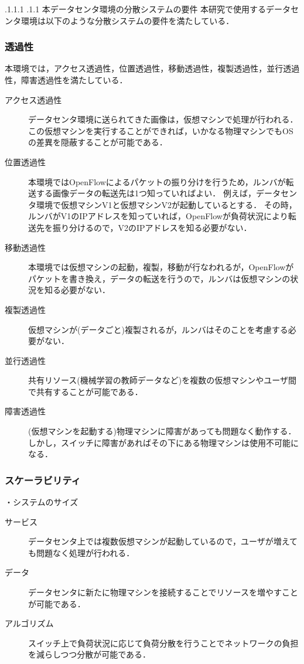 \documentclass[a4paper, twocolumn]{jarticle}
\makeatletter
\def\subsection{\@startsection{subsection}{1}{\z@}%
 {.1\Cvs \@plus.1\Cdp \@minus.1\Cdp}%
 {.1\Cvs \@plus.1\Cdp}%
 {\normalfont\normalsize\bfseries}}
\makeatother
\begin{document}
\subsection{本データセンタ環境の分散システムの要件}
本研究で使用するデータセンタ環境は以下のような分散システムの要件を満たしている．

\subsubsection{透過性}
本環境では，アクセス透過性，位置透過性，移動透過性，複製透過性，並行透過性，障害透過性を満たしている．
\begin{description}
\item [アクセス透過性]
データセンタ環境に送られてきた画像は，仮想マシンで処理が行われる．
この仮想マシンを実行することができれば，いかなる物理マシンでもOSの差異を隠蔽することが可能である．

\item [位置透過性]
本環境ではOpenFlowによるパケットの振り分けを行うため，ルンバが転送する画像データの転送先は1つ知っていればよい．
例えば，データセンタ環境で仮想マシンV1と仮想マシンV2が起動しているとする．
その時，ルンバがV1のIPアドレスを知っていれば，OpenFlowが負荷状況により転送先を振り分けるので，V2のIPアドレスを知る必要がない．

\item [移動透過性]
本環境では仮想マシンの起動，複製，移動が行なわれるが，OpenFlowがパケットを書き換え，データの転送を行うので，ルンバは仮想マシンの状況を知る必要がない．

\item [複製透過性]
仮想マシンが(データごと)複製されるが，ルンバはそのことを考慮する必要がない．

\item [並行透過性]
共有リソース(機械学習の教師データなど)を複数の仮想マシンやユーザ間で共有することが可能である．

\item [障害透過性]
(仮想マシンを起動する)物理マシンに障害があっても問題なく動作する．
しかし，スイッチに障害があればその下にある物理マシンは使用不可能になる．
\end{description}

\subsubsection{スケーラビリティ}
・システムのサイズ
\begin{description}
\item [サービス]
データセンタ上では複数仮想マシンが起動しているので，ユーザが増えても問題なく処理が行われる．

\item[データ]
データセンタに新たに物理マシンを接続することでリソースを増やすことが可能である．

\item[アルゴリズム]
スイッチ上で負荷状況に応じて負荷分散を行うことでネットワークの負担を減らしつつ分散が可能である．
\end{description}
\end{document}
